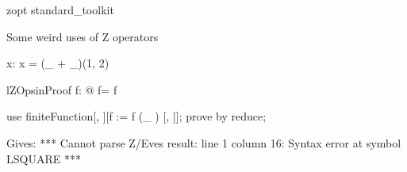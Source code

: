 \begin{zsection}
   \SECTION zopt \parents standard\_toolkit
\end{zsection}

Some weird uses of Z operators

\begin{axdef}
   x: \nat
\where
   x = (\_ + \_)(1, 2)
\end{axdef}

\begin{theorem}{lZOpsinProof}
   \forall f: \nat \fun \nat @ f\inv = f
\end{theorem}

\begin{zproof}[lZOpsinProof]
  use finiteFunction[\nat, \nat][f := f (\_ \inv) [\nat, \nat]];
  prove by reduce;
\end{zproof}

Gives:
***
Cannot parse Z/Eves result:
line 1 column 16: Syntax error at symbol LSQUARE
***